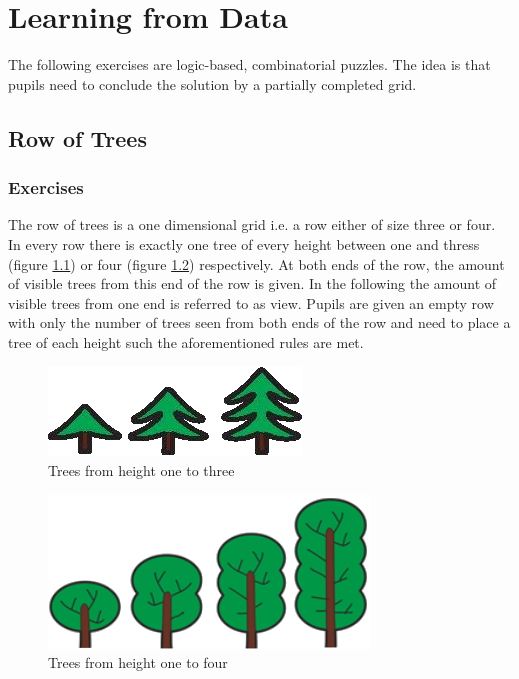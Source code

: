 \chapter{Learning from Data}
\label{chapter:learningFromData}

The following exercises are logic-based, combinatorial puzzles. The idea is that pupils need to conclude the solution by a partially completed grid.

\section{Row of Trees}
\label{section:treeRow}

\subsection{Exercises}
The row of trees is a one dimensional grid i.e. a row either of size three or four. In every row there is exactly one tree of every height between one and thress (figure \ref{fig:trees_3}) or four (figure \ref{fig:trees_4}) respectively. At both ends of the row, the amount of visible trees from this end of the row is given. In the following the amount of visible trees from one end is referred to as view.
Pupils are given an empty row with only the number of trees seen from both ends of the row and need to place a tree of each height such the aforementioned rules are met.

\begin{figure} 
    \centering
    \includegraphics[width=0.4 \columnwidth]{figures/trees_3.png}
    \caption{Trees from height one to three} 
    \label{fig:trees_3} 
\end{figure}

\begin{figure} 
    \centering
    \includegraphics[width=0.4 \columnwidth]{figures/trees_4.png}
    \caption{Trees from height one to four} 
    \label{fig:trees_4} 
\end{figure}

